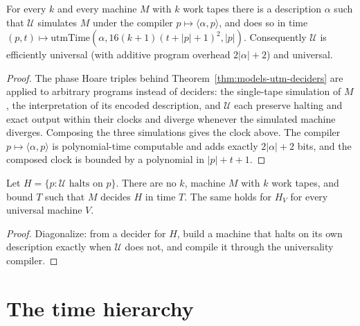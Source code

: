 \begin{theorem}
  \label{thm:utm}
  \leanok
  For every $k$ and every machine $M$ with $k$ work tapes there is a description
  $\alpha$ such that $\mathcal{U}$ simulates $M$ under the compiler
  $p \mapsto \langle \alpha, p \rangle$, and does so in time
  $(p, t) \mapsto \mathrm{utmTime}(\alpha, 16(k+1)(t + |p| + 1)^2, |p|)$.
  Consequently $\mathcal{U}$ is efficiently universal (with additive program
  overhead $2|\alpha| + 2$) and universal.
\end{theorem}
\begin{proof}
  \leanok
  The phase Hoare triples behind Theorem~\ref{thm:models-utm-deciders} are
  applied to arbitrary programs instead of deciders: the single-tape
  simulation of $M$, the interpretation of its encoded description, and
  $\mathcal{U}$ each preserve halting and exact output within their clocks and
  diverge whenever the simulated machine diverges. Composing the three
  simulations gives the clock above. The compiler
  $p \mapsto \langle \alpha, p \rangle$ is polynomial-time computable and adds
  exactly $2|\alpha| + 2$ bits, and the composed clock is bounded by a
  polynomial in $|p| + t + 1$.
\end{proof}

\begin{theorem}
  \label{thm:models-halting-undecidable}
  Let $H = \{ p : \mathcal{U} \text{ halts on } p \}$. There are no $k$,
  machine $M$ with $k$ work tapes, and bound $T$ such that $M$ decides $H$ in
  time $T$. The same holds for $H_V$ for every universal machine $V$.
\end{theorem}
\begin{proof}
  Diagonalize: from a decider for $H$, build a machine that halts on its own
  description exactly when $\mathcal{U}$ does not, and compile it through the
  universality compiler.
\end{proof}

\section{The time hierarchy}

